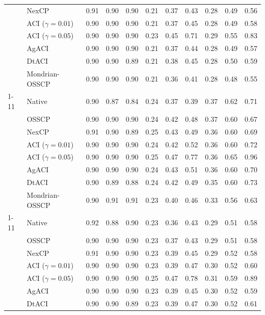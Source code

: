 \begin{tabular}{@{}llccccccccc@{}}
 & NexCP & 0.91 & 0.90 & 0.90 & 0.21 & 0.37 & 0.43 & 0.28 & 0.49 & 0.56 \\
 & ACI ($\gamma=0.01$) & 0.90 & 0.90 & 0.90 & 0.21 & 0.37 & 0.45 & 0.28 & 0.49 & 0.58 \\
 & ACI ($\gamma=0.05$) & 0.90 & 0.90 & 0.90 & 0.23 & 0.45 & 0.71 & 0.29 & 0.55 & 0.83 \\
 & AgACI & 0.90 & 0.90 & 0.90 & 0.21 & 0.37 & 0.44 & 0.28 & 0.49 & 0.57 \\
 & DtACI & 0.90 & 0.90 & 0.89 & 0.21 & 0.38 & 0.45 & 0.28 & 0.50 & 0.59 \\
 & Mondrian-OSSCP & 0.90 & 0.90 & 0.90 & 0.21 & 0.36 & 0.41 & 0.28 & 0.48 & 0.55 \\
\cmidrule{1-11}
\multirow[t]{8}{*}{Bootstrap ensemble} & Native & 0.90 & 0.87 & 0.84 & 0.24 & 0.37 & 0.39 & 0.37 & 0.62 & 0.71 \\
 & OSSCP & 0.90 & 0.90 & 0.90 & 0.24 & 0.42 & 0.48 & 0.37 & 0.60 & 0.67 \\
 & NexCP & 0.91 & 0.90 & 0.89 & 0.25 & 0.43 & 0.49 & 0.36 & 0.60 & 0.69 \\
 & ACI ($\gamma=0.01$) & 0.90 & 0.90 & 0.90 & 0.24 & 0.42 & 0.52 & 0.36 & 0.60 & 0.72 \\
 & ACI ($\gamma=0.05$) & 0.90 & 0.90 & 0.90 & 0.25 & 0.47 & 0.77 & 0.36 & 0.65 & 0.96 \\
 & AgACI & 0.90 & 0.90 & 0.90 & 0.24 & 0.43 & 0.51 & 0.36 & 0.60 & 0.70 \\
 & DtACI & 0.90 & 0.89 & 0.88 & 0.24 & 0.42 & 0.49 & 0.35 & 0.60 & 0.73 \\
 & Mondrian-OSSCP & 0.90 & 0.91 & 0.91 & 0.23 & 0.40 & 0.46 & 0.33 & 0.56 & 0.63 \\
\cmidrule{1-11}
\multirow[t]{8}{*}{TabPFN} & Native & 0.92 & 0.88 & 0.90 & 0.23 & 0.36 & 0.43 & 0.29 & 0.51 & 0.58 \\
 & OSSCP & 0.90 & 0.90 & 0.90 & 0.23 & 0.37 & 0.43 & 0.29 & 0.51 & 0.58 \\
 & NexCP & 0.91 & 0.90 & 0.90 & 0.23 & 0.39 & 0.45 & 0.29 & 0.52 & 0.58 \\
 & ACI ($\gamma=0.01$) & 0.90 & 0.90 & 0.90 & 0.23 & 0.39 & 0.47 & 0.30 & 0.52 & 0.60 \\
 & ACI ($\gamma=0.05$) & 0.90 & 0.90 & 0.90 & 0.25 & 0.47 & 0.78 & 0.31 & 0.59 & 0.89 \\
 & AgACI & 0.90 & 0.90 & 0.90 & 0.23 & 0.39 & 0.45 & 0.30 & 0.52 & 0.59 \\
 & DtACI & 0.90 & 0.90 & 0.89 & 0.23 & 0.39 & 0.47 & 0.30 & 0.52 & 0.61 \\

\end{tabular}
